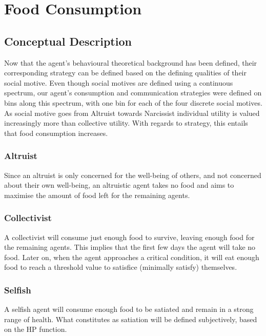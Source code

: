 \section{Food Consumption}\label{food_consumption}

\subsection{Conceptual Description}
Now that the agent's behavioural theoretical background has been defined, their corresponding strategy can be defined based on the defining qualities of their social motive. Even though social motives are defined using a continuous spectrum, our agent’s consumption and communication strategies were defined on bins along this spectrum, with one bin for each of the four discrete social motives. As social motive goes from Altruist towards Narcissist individual utility is valued increasingly more than collective utility. With regards to strategy, this entails that food consumption increases.


\subsubsection{Altruist}
Since an altruist is only concerned for the well-being of others, and not concerned about their own well-being, an altruistic agent takes no food and aims to maximise the amount of food left for the remaining agents.

\subsubsection{Collectivist}
A collectivist will consume just enough food to survive, leaving enough food for the remaining agents. This implies that the first few days the agent will take no food. Later on, when the agent approaches a critical condition, it will eat enough food to reach a threshold value to satisfice (minimally satisfy) themselves.

\subsubsection{Selfish}
A selfish agent will consume enough food to be satiated and remain in a strong range of health. What constitutes as satiation will be defined subjectively, based on the HP function.

